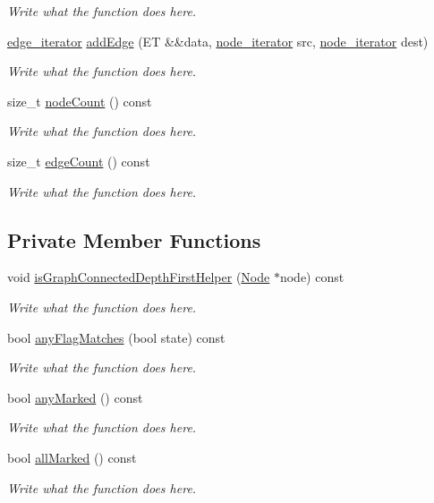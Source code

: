 \begin{DoxyCompactItemize}
\begin{DoxyCompactList}\small\item\em Write what the function does here. \end{DoxyCompactList}\item 
\hyperlink{classgraph_1_1edge__iterator}{edge\+\_\+iterator} \hyperlink{classgraph_a0806e4b7471c184dff54810cc42affa2}{add\+Edge} (E\+T \&\&data, \hyperlink{classgraph_1_1node__iterator}{node\+\_\+iterator} src, \hyperlink{classgraph_1_1node__iterator}{node\+\_\+iterator} dest)
\begin{DoxyCompactList}\small\item\em Write what the function does here. \end{DoxyCompactList}\item 
size\+\_\+t \hyperlink{classgraph_a6a3e81c21b51b8575a5f47e0b2dcab20}{node\+Count} () const 
\begin{DoxyCompactList}\small\item\em Write what the function does here. \end{DoxyCompactList}\item 
size\+\_\+t \hyperlink{classgraph_a83ef554d61963a3ac05ab1a1d052aad9}{edge\+Count} () const 
\begin{DoxyCompactList}\small\item\em Write what the function does here. \end{DoxyCompactList}\end{DoxyCompactItemize}
\subsection*{Private Member Functions}
\begin{DoxyCompactItemize}
\item 
void \hyperlink{classgraph_ac745949ed8867e94ca254905f6fd6194}{is\+Graph\+Connected\+Depth\+First\+Helper} (\hyperlink{structgraph_1_1Node}{Node} $\ast$node) const 
\begin{DoxyCompactList}\small\item\em Write what the function does here. \end{DoxyCompactList}\item 
bool \hyperlink{classgraph_a54e520186fad4c7e75912932910ef0c6}{any\+Flag\+Matches} (bool state) const 
\begin{DoxyCompactList}\small\item\em Write what the function does here. \end{DoxyCompactList}\item 
bool \hyperlink{classgraph_a14b48e6c76549fe5faff1ea51ec78fb3}{any\+Marked} () const 
\begin{DoxyCompactList}\small\item\em Write what the function does here. \end{DoxyCompactList}\item 
bool \hyperlink{classgraph_ab65c298ca639f7293459af9038920c6d}{all\+Marked} () const 
\begin{DoxyCompactList}\small\item\em Write what the function does here. \end{DoxyCompactList}\end{DoxyCompactItemize}
